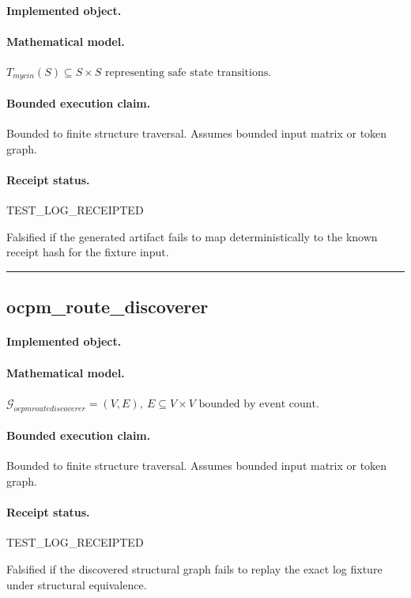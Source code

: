 \paragraph{Implemented object.} 
\paragraph{Mathematical model.} $T_{mycin}(S) \subseteq S \times S \text{ representing safe state transitions}.$
\paragraph{Bounded execution claim.} Bounded to finite structure traversal. Assumes bounded input matrix or token graph.
\paragraph{Receipt status.} TEST\_LOG\_RECEIPTED
\begin{falsifier}
Falsified if the generated artifact fails to map deterministically to the known receipt hash for the fixture input.
\end{falsifier}

\vspace{1em}\hrule\vspace{1em}
\subsection{ocpm\_route\_discoverer}
\paragraph{Implemented object.} 
\paragraph{Mathematical model.} $\mathcal{G}_{ocpmroutediscoverer} = (V, E), \ E \subseteq V \times V \text{ bounded by event count}.$
\paragraph{Bounded execution claim.} Bounded to finite structure traversal. Assumes bounded input matrix or token graph.
\paragraph{Receipt status.} TEST\_LOG\_RECEIPTED
\begin{falsifier}
Falsified if the discovered structural graph fails to replay the exact log fixture under structural equivalence.
\end{falsifier}
